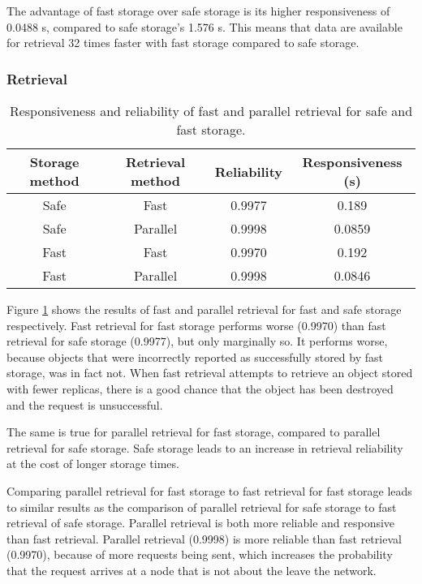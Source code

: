 The advantage of fast storage over safe storage is its higher responsiveness of 0.0488 s, compared to safe storage's 1.576 s. This means that data are available for retrieval 32 times faster with fast storage compared to safe storage.

\subsubsection{Retrieval}

\begin{table}[htbp]
\centering
\begin{tabular}{|c|c|c|c|}
\hline
Storage method & Retrieval method & Reliability & Responsiveness (s)\\
\hline
Safe           &   Fast           &   0.9977    &   0.189  \\
Safe           &   Parallel       &   0.9998    &   0.0859 \\
Fast           &   Fast           &   0.9970    &   0.192  \\
Fast           &   Parallel       &   0.9998    &   0.0846 \\
\hline
\end{tabular}
\caption{Responsiveness and reliability of fast and parallel retrieval for safe and fast storage.}
\label{tab_pithos_retrieval_results}
\end{table}
%
Figure \ref{tab_pithos_retrieval_results} shows the results of fast and parallel retrieval for fast and safe storage respectively. Fast retrieval for fast storage performs worse (0.9970) than fast retrieval for safe storage (0.9977), but only marginally so. It performs worse, because objects that were incorrectly reported as successfully stored by fast storage, was in fact not. When fast retrieval attempts to retrieve an object stored with fewer replicas, there is a good chance that the object has been destroyed and the request is unsuccessful.

The same is true for parallel retrieval for fast storage, compared to parallel retrieval for safe storage. Safe storage leads to an increase in retrieval reliability at the cost of longer storage times.

Comparing parallel retrieval for fast storage to fast retrieval for fast storage leads to similar results as the comparison of parallel retrieval for safe storage to fast retrieval of safe storage. Parallel retrieval is both more reliable and responsive than fast retrieval. Parallel retrieval (0.9998) is more reliable than fast retrieval (0.9970), because of more requests being sent, which increases the probability that the request arrives at a node that is not about the leave the network.

